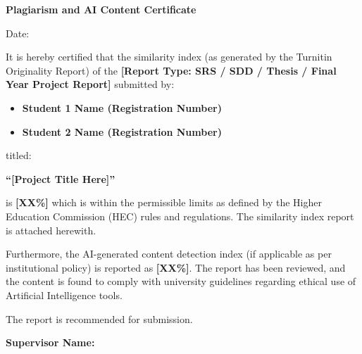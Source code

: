 
\newpage
\thispagestyle{empty}

\begin{center}
\textbf{\LARGE Plagiarism and AI Content Certificate}
\end{center}

\vspace{1cm}

\noindent
Date: \underline{\hspace{4cm}}

\vspace{1cm}

\noindent
It is hereby certified that the similarity index (as generated by the Turnitin 
Originality Report) of the \textbf{[Report Type: SRS / SDD / Thesis / Final Year Project Report]} 
submitted by:

\begin{itemize}
    \item \textbf{Student 1 Name (Registration Number)}
    \item \textbf{Student 2 Name (Registration Number)}  %
\end{itemize}

\noindent
titled:

\begin{center}
\textbf{“[Project Title Here]”}
\end{center}

\noindent
is \textbf{[XX\%]} which is within the permissible limits as defined by the 
Higher Education Commission (HEC) rules and regulations. The similarity index 
report is attached herewith.

\vspace{0.5cm}

\noindent
Furthermore, the AI-generated content detection index (if applicable as per 
institutional policy) is reported as \textbf{[XX\%]}. The report has been reviewed, 
and the content is found to comply with university guidelines regarding 
ethical use of Artificial Intelligence tools.

\vspace{0.5cm}

\noindent
The report is recommended for submission.

\vspace{2cm}

\noindent
\textbf{Supervisor Name:} \underline{\hspace{6cm}}  

